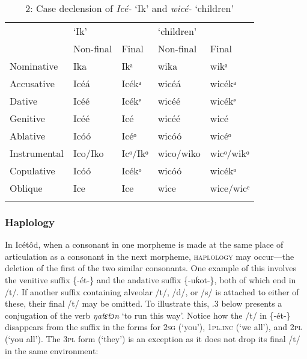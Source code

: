 \begin{table}
\caption{2: Case declension of \textit{Icé- }‘Ik’ and \textit{wicé- }‘children’}
\label{tab:2}


\begin{tabularx}{\textwidth}{XXXXX} & \multicolumn{2}{X}{‘Ik’} & \multicolumn{2}{X}{‘children’}\\
\lsptoprule
& Non-final & Final & Non-final & Final\\
Nominative & Ika & Ikᵃ & wika & wikᵃ\\
Accusative & Icéá & Icékᵃ & wicéá & wicékᵃ\\
Dative & Icéé & Icékᵉ & wicéé & wicékᵉ\\
Genitive & Icéé & Icé & wicéé & wicé\\
Ablative & Icóó & Icéᵒ & wicóó & wicéᵒ\\
Instrumental & Ico/Iko & Icᵒ/Ikᵒ & wico/wiko & wicᵒ/wikᵒ\\
Copulative & Icóó & Icékᵒ & wicóó & wicékᵒ\\
Oblique & Ice & Ice & wice & wice/wicᵉ\\
\lspbottomrule
\end{tabularx}
\end{table}


\subsubsection{Haplology}

In Icétôd, when a consonant in one morpheme is made at the same place of articulation as a consonant in the next morpheme, \textsc{haplology }may occur—the deletion of the first of the two similar consonants. One example of this involves the venitive\textsc{ }suffix \{-ét-\} and the andative\textsc{ }suffix \{-uƙot-\}, both of which end in /t/. If another suffix containing alveolar /t/, /d/, or /s/ is attached to either of these, their final /t/ may be omitted. To illustrate this, .3 below presents a conjugation of the verb \textit{ŋatɛtɔn }‘to run this way’. Notice how the /t/ in \{-ét-\} disappears from the suffix in the forms for \textsc{2sg} (‘you’), \textsc{1pl.inc} (‘we all’), and \textsc{2pl} (‘you all’). The 3\textsc{pl} form (‘they’) is an exception as it does not drop its final /t/ in the same environment:


